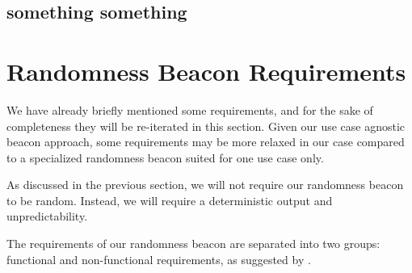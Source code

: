 \subsection{something something}

\section{Randomness Beacon Requirements}
\label{sec:beacon_requirements}

We have already briefly mentioned some requirements, and for the sake of completeness they will be re-iterated in this section.
Given our use case agnostic beacon approach, some requirements may be more relaxed in our case compared to a specialized randomness beacon suited for one use case only. %

As discussed in the previous section, we will not require our randomness beacon to be random. Instead, we will require a deterministic output and unpredictability.

The requirements of our randomness beacon are separated into two groups: functional and non-functional requirements, as suggested by \citet[sec.\ 1.4.1]{swebok}.

